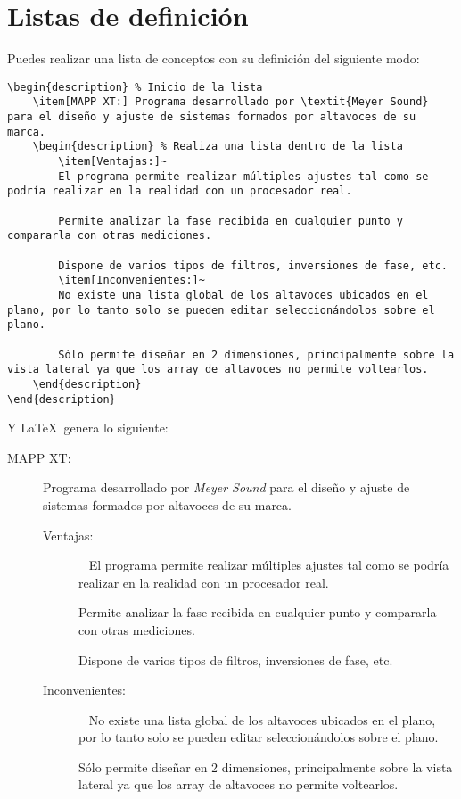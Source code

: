 \section{Listas de definición}
 
 Puedes realizar una lista de conceptos con su definición del siguiente modo:
 
\begin{lstlisting}[style=Latex-color]
\begin{description} % Inicio de la lista
 	\item[MAPP XT:] Programa desarrollado por \textit{Meyer Sound} para el diseño y ajuste de sistemas formados por altavoces de su marca.
  	\begin{description} % Realiza una lista dentro de la lista
  		\item[Ventajas:]~ 
  		El programa permite realizar múltiples ajustes tal como se podría realizar en la realidad con un procesador real.
  	
  		Permite analizar la fase recibida en cualquier punto y compararla con otras mediciones.
  	
  		Dispone de varios tipos de filtros, inversiones de fase, etc.
  		\item[Inconvenientes:]~ 
  		No existe una lista global de los altavoces ubicados en el plano, por lo tanto solo se pueden editar seleccionándolos sobre el plano.
  	
  		Sólo permite diseñar en 2 dimensiones, principalmente sobre la vista lateral ya que los array de altavoces no permite voltearlos.
  	\end{description}
\end{description}
\end{lstlisting}

 Y \LaTeX~genera lo siguiente:
 
\begin{description} %
 	\item[MAPP XT:] Programa desarrollado por \textit{Meyer Sound} para el diseño y ajuste de sistemas formados por altavoces de su marca.
  	\begin{description} %
  		\item[Ventajas:]~ 
  		El programa permite realizar múltiples ajustes tal como se podría realizar en la realidad con un procesador real.
  	
  		Permite analizar la fase recibida en cualquier punto y compararla con otras mediciones.
  	
  		Dispone de varios tipos de filtros, inversiones de fase, etc.
  		\item[Inconvenientes:]~ 
  		No existe una lista global de los altavoces ubicados en el plano, por lo tanto solo se pueden editar seleccionándolos sobre el plano.
  	
  		Sólo permite diseñar en 2 dimensiones, principalmente sobre la vista lateral ya que los array de altavoces no permite voltearlos.
  	\end{description}
\end{description}
